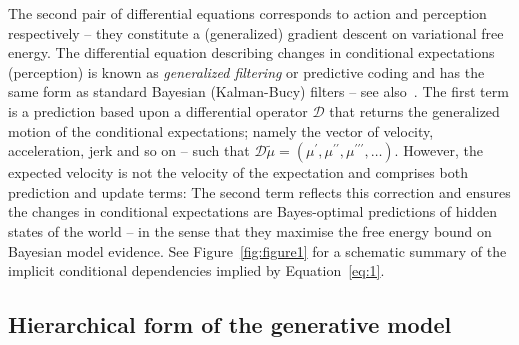 \documentclass[a4paper]{article} %
\begin{document}
The second pair of differential equations corresponds to action and perception respectively -- they constitute a (generalized) gradient descent on variational free energy. The differential equation describing changes in conditional expectations (perception) is known as \emph{generalized filtering} or predictive coding and has the same form as standard Bayesian (Kalman-Bucy) filters -- see also~\citep{Beal03,Rao99}. %
The first term is a prediction based upon a differential operator $\mathcal{D}$ that returns the generalized motion of the conditional expectations; namely the vector of velocity, acceleration, jerk and so on -- such that  $\mathcal{D}\tilde{\mu} = (\mu^{\prime}, \mu^{\prime\prime}, \mu^{\prime\prime\prime}, \ldots)$. However, the expected velocity is not the velocity of the expectation and comprises both prediction and update terms: The second term reflects this correction and ensures the changes in conditional expectations are Bayes-optimal predictions of hidden states of the world -- in the sense that they maximise the free energy bound on Bayesian model evidence. See Figure~\ref{fig:figure1} for a schematic summary of the implicit conditional dependencies implied by Equation~\ref{eq:1}.

\subsection{Hierarchical form of the generative model}
\end{document}
